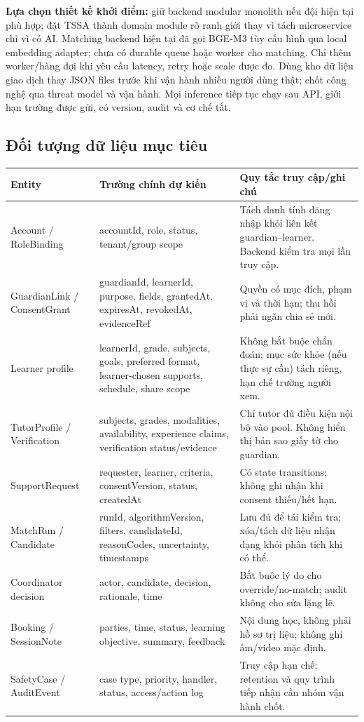 \documentclass[11pt,a4paper]{article}
\begin{document}
\textbf{Lựa chọn thiết kế khởi điểm:} giữ backend modular monolith nếu đội hiện tại phù hợp; đặt TSSA thành domain module rõ ranh giới thay vì tách microservice chỉ vì có AI. Matching backend hiện tại đã gọi BGE-M3 tùy cấu hình qua local embedding adapter; chưa có durable queue hoặc worker cho matching. Chỉ thêm worker/hàng đợi khi yêu cầu latency, retry hoặc scale được đo. Dùng kho dữ liệu giao dịch thay JSON files trước khi vận hành nhiều người dùng thật; chốt công nghệ qua threat model và vận hành. Mọi inference tiếp tục chạy sau API, giới hạn trường được gửi, có version, audit và cơ chế tắt.

\subsection{Đối tượng dữ liệu mục tiêu}
\begin{tabularx}{\textwidth}{p{3.4cm}p{4.6cm}Y}
\toprule
\textbf{Entity} & \textbf{Trường chính dự kiến} & \textbf{Quy tắc truy cập/ghi chú} \\
\midrule
Account / RoleBinding & accountId, role, status, tenant/group scope & Tách danh tính đăng nhập khỏi liên kết guardian--learner. Backend kiểm tra mọi lần truy cập. \\
GuardianLink / ConsentGrant & guardianId, learnerId, purpose, fields, grantedAt, expiresAt, revokedAt, evidenceRef & Quyền có mục đích, phạm vi và thời hạn; thu hồi phải ngăn chia sẻ mới. \\
Learner profile & learnerId, grade, subjects, goals, preferred format, learner-chosen supports, schedule, share scope & Không bắt buộc chẩn đoán; mục sức khỏe (nếu thực sự cần) tách riêng, hạn chế trường người xem. \\
TutorProfile / Verification & subjects, grades, modalities, availability, experience claims, verification status/evidence & Chỉ tutor đủ điều kiện nội bộ vào pool. Không hiển thị bản sao giấy tờ cho guardian. \\
SupportRequest & requester, learner, criteria, consentVersion, status, createdAt & Có state transitions; không ghi nhận khi consent thiếu/hết hạn. \\
MatchRun / Candidate & runId, algorithmVersion, filters, candidateId, reasonCodes, uncertainty, timestamps & Lưu đủ để tái kiểm tra; xóa/tách dữ liệu nhận dạng khỏi phân tích khi có thể. \\
Coordinator decision & actor, candidate, decision, rationale, time & Bắt buộc lý do cho override/no-match; audit không cho sửa lặng lẽ. \\
Booking / SessionNote & parties, time, status, learning objective, summary, feedback & Nội dung học, không phải hồ sơ trị liệu; không ghi âm/video mặc định. \\
SafetyCase / AuditEvent & case type, priority, handler, status, access/action log & Truy cập hạn chế; retention và quy trình tiếp nhận cần nhóm vận hành chốt. \\
\bottomrule
\end{tabularx}
\end{document}
